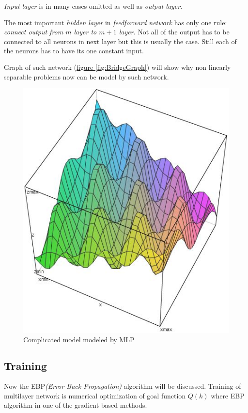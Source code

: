 \textit{Input layer} is in many cases omitted as well as \textit{output layer}.

The most important \textit{hidden layer} in \textit{feedforward network} has only one rule: \textit{connect output from $m$ layer to $m+1$ layer}. Not all of the output has to be connected to all neurons in next layer but this is usually the case. Still each of the neurons has to have its one constant input.

Graph of such network (\hyperref[fig:BridgeGraph]{figure \ref{fig:BridgeGraph}}) will show why non linearly separable problems now can be model by such network.

\begin{figure}[!h]
    \centering
    \includegraphics[scale=0.8]{Media/SolutionGraph.png}
    \caption{Complicated model modeled by MLP}
    \label{fig:SolutionGraph}
\end{figure}

\newpage
\subsection{Training}
\label{sec:Training}

Now the EBP\textit{(Error Back Propagation)} algorithm will be discussed.
Training of multilayer network is numerical optimization of goal function $Q(k)$ where EBP algorithm in one of the gradient based methods.

